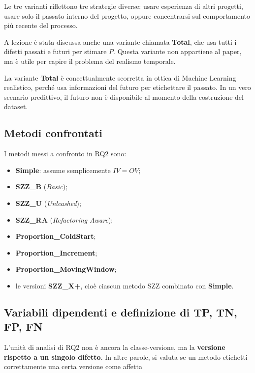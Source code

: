 Le tre varianti riflettono tre strategie diverse: usare esperienza di altri progetti, usare solo il passato interno del progetto, oppure concentrarsi sul comportamento più recente del processo.

\begin{notaprof}
A lezione è stata discussa anche una variante chiamata \textbf{Total}, che usa tutti i difetti passati e futuri per stimare \(P\). Questa variante non appartiene al paper, ma è utile per capire il problema del realismo temporale.
\end{notaprof}

\begin{notaesame}
La variante \textbf{Total} è concettualmente scorretta in ottica di Machine Learning realistico, perché usa informazioni del futuro per etichettare il passato. In un vero scenario predittivo, il futuro non è disponibile al momento della costruzione del dataset.
\end{notaesame}

\subsection{Metodi confrontati}

I metodi messi a confronto in RQ2 sono:

\begin{itemize}
    \item \textbf{Simple}: assume semplicemente \(IV = OV\);
    \item \textbf{SZZ\_B} (\emph{Basic});
    \item \textbf{SZZ\_U} (\emph{Unleashed});
    \item \textbf{SZZ\_RA} (\emph{Refactoring Aware});
    \item \textbf{Proportion\_ColdStart};
    \item \textbf{Proportion\_Increment};
    \item \textbf{Proportion\_MovingWindow};
    \item le versioni \textbf{SZZ\_X+}, cioè ciascun metodo SZZ combinato con \textbf{Simple}.
\end{itemize}

\subsection{Variabili dipendenti e definizione di TP, TN, FP, FN}

L'unità di analisi di RQ2 non è ancora la classe-versione, ma la \textbf{versione rispetto a un singolo difetto}. In altre parole, si valuta se un metodo etichetti correttamente una certa versione come affetta